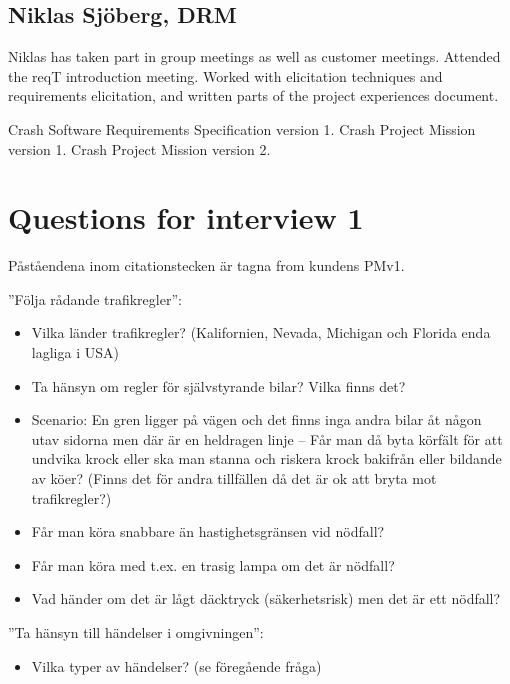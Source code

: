 \documentclass[10pt]{article}
\begin{document}
\subsection{Niklas Sjöberg, DRM}
Niklas has taken part in group meetings as well as customer meetings. Attended the reqT introduction meeting. Worked with elicitation techniques and requirements elicitation, and written parts of the project experiences document. 

\begin{thebibliography}{1}
 Crash Software Requirements Specification version 1. 
 Crash Project Mission version 1.
 Crash Project Mission version 2.
\end{thebibliography}
\newpage

\appendix
\section{Questions for interview 1}
Påståendena inom citationstecken är tagna from kundens PMv1.

\noindent”Följa rådande trafikregler”:
\begin{itemize}
\item Vilka länder trafikregler? (Kalifornien, Nevada, Michigan och Florida enda lagliga i USA)
\item Ta hänsyn om regler för självstyrande bilar? Vilka finns det?
\item Scenario: En gren ligger på vägen och det finns inga andra bilar åt någon utav sidorna men där är en heldragen linje – Får man då byta körfält för att undvika krock eller ska man stanna och riskera krock bakifrån eller bildande av köer? (Finns det för andra tillfällen då det är ok att bryta mot trafikregler?)
\item Får man köra snabbare än hastighetsgränsen vid nödfall?
\item Får man köra med t.ex. en trasig lampa om det är nödfall?
\item Vad händer om det är lågt däcktryck (säkerhetsrisk) men det är ett nödfall?
\end{itemize}
\hfill \break

\noindent ”Ta hänsyn till händelser i omgivningen”:
\begin{itemize}
\item Vilka typer av händelser? (se föregående fråga)
\end{itemize}
\hfill \break
\end{document}
